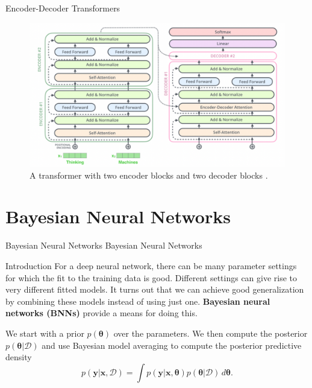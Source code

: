 \documentclass{beamer}
\begin{document}
\begin{frame}{Encoder-Decoder Transformers}
    \begin{figure}
        \centering
        \includegraphics[scale=0.6]{encoder_decoder_transformer}
        \caption{A transformer with two encoder blocks and two decoder blocks \cite{pml2Book}.}
        \label{fig:encoder_decoder_transformer}
    \end{figure}
\end{frame}

\section{Bayesian Neural Networks}

\begin{frame}{Bayesian Neural Networks}
    Bayesian Neural Networks
\end{frame}

\begin{frame}{Introduction}
    For a deep neural network, there can be many parameter settings for which the fit to the training data is good. Different settings can give rise to very different fitted models. It turns out that we can achieve good generalization by combining these models instead of using just one. \textbf{Bayesian neural networks (BNNs)} provide a means for doing this.
    
    \medskip
    
    We start with a prior $p(\boldsymbol{\theta})$ over the parameters. We then compute the posterior $p(\boldsymbol{\theta} | \mathcal{D})$ and use Bayesian model averaging to compute the posterior predictive density
    \begin{equation*}
        p(\boldsymbol{y} | \boldsymbol{x}, \mathcal{D}) = \int p(\boldsymbol{y} | \boldsymbol{x}, \boldsymbol{\theta})p(\boldsymbol{\theta} | \mathcal{D})\,d\boldsymbol{\theta}.
    \end{equation*}
\end{frame}
\end{document}
